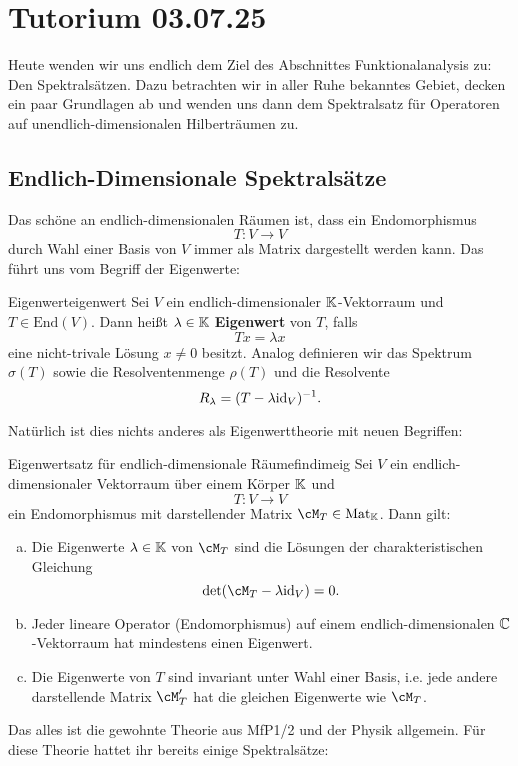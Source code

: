 \section{Tutorium 03.07.25}
\label{sec:03_07_25}

Heute wenden wir uns endlich dem Ziel des Abschnittes Funktionalanalysis zu: Den Spektralsätzen. Dazu betrachten wir in aller Ruhe bekanntes Gebiet, decken ein paar Grundlagen ab und wenden uns dann dem Spektralsatz für Operatoren auf unendlich-dimensionalen Hilberträumen zu.

\subsection{Endlich-Dimensionale Spektralsätze}
\label{subsec:finitedim}

Das schöne an endlich-dimensionalen Räumen ist, dass ein Endomorphismus
\[
T: V \to V
\]
durch Wahl einer Basis von $V$ immer als Matrix dargestellt werden kann. Das führt uns vom Begriff der Eigenwerte:
\begin{definition}{Eigenwert}{eigenwert}
Sei $V$ ein endlich-dimensionaler $\mathbb{K}$-Vektorraum und $T \in \text{End}(V)$. Dann heißt $\lambda \in \mathbb{K}$ \textbf{Eigenwert} von $T$, falls \[Tx = \lambda x\] eine nicht-trivale Lösung $x \neq 0$ besitzt. Analog definieren wir das Spektrum $\sigma(T)$ sowie die Resolventenmenge $\rho(T)$ und die Resolvente \[R_\lambda = (T- \lambda \text{id}_V)^{-1}.\]
\end{definition}
Natürlich ist dies nichts anderes als Eigenwerttheorie mit neuen Begriffen:
\begin{satz}{Eigenwertsatz für endlich-dimensionale Räume}{findimeig}
Sei $V$ ein endlich-dimensionaler Vektorraum über einem Körper $\mathbb{K}$ und 
\[T:V \to V\] ein Endomorphismus mit darstellender Matrix $\cM_T \in \text{Mat}_\K$. Dann gilt:
\begin{enumerate}[(a)]
\item Die Eigenwerte $\lambda \in \mathbb{K}$ von $\cM_T$ sind die Lösungen der charakteristischen Gleichung
\[ \det(\cM_T - \lambda \id_V) = 0. \]
\item Jeder lineare Operator (Endomorphismus) auf einem endlich-dimensionalen $\mathbb{C}$-Vektorraum hat mindestens einen Eigenwert.
\item Die Eigenwerte von $T$ sind invariant unter Wahl einer Basis, i.e. jede andere darstellende Matrix $\cM'_T$ hat die gleichen Eigenwerte wie $\cM_T$.
\end{enumerate}
\end{satz}
Das alles ist die gewohnte Theorie aus MfP1/2 und der Physik allgemein. Für diese Theorie hattet ihr bereits einige Spektralsätze:

